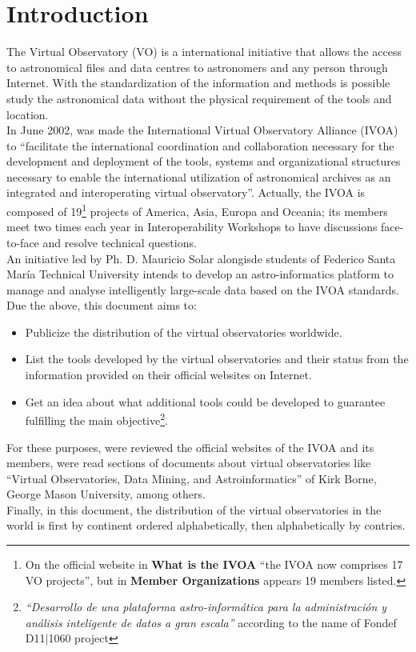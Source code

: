 \section{Introduction}
The Virtual Observatory (VO) \cite{website:ivoa-home} \nocite{Borne2013}
\nocite{HanischQuinn2003} is a international initiative that allows the access
to astronomical files and data centres to astronomers and any person through
Internet. With the standardization of the information and methods is possible
study the astronomical data without the physical requirement of the tools and
location.\\

In June 2002, was made the International Virtual Observatory Alliance (IVOA) to
``facilitate the international coordination and collaboration necessary for the
development and deployment of the tools, systems and organizational structures
necessary to enable the international utilization of astronomical archives as an
integrated and interoperating virtual observatory''.  Actually, the IVOA is
composed of 19\footnote{On the official website in \textbf{What is the IVOA}
``the IVOA now comprises 17 VO projects'', but in \textbf{Member Organizations}
appears 19 members listed.} projects of America, Asia, Europa and Oceania; its
members meet two times each year in Interoperability  Workshops to have
discussions face-to-face and resolve technical questions.\\

An initiative led by Ph. D. Mauricio Solar alongisde students of Federico Santa
Mar\'{i}a Technical University intends to develop an astro-informatics platform
to manage and analyse intelligently large-scale data based on the IVOA
standards. Due the above, this document aims to:

\begin{itemize}
	\item Publicize the distribution of the virtual observatories worldwide.
    \item List the tools developed by the virtual observatories and their status
from the information provided on their official websites on Internet.
    \item Get an idea about what additional tools could be developed to
guarantee fulfilling the main objective\footnote{\textit{``Desarrollo de una
plataforma astro-inform\'{a}tica para la administraci\'{o}n y an\'{a}lisis
inteligente de datos a gran escala''} according to the name of Fondef D11$
\vert $1060 project}.
\end{itemize}

For these purposes, were reviewed the official websites of the IVOA and its
members, were read sections of documents about virtual observatories like
``Virtual Observatories, Data Mining, and Astroinformatics'' of Kirk Borne,
George Mason University, among others.\\

Finally, in this document, the distribution of the virtual observatories in the
world is first by continent ordered alphabetically, then alphabetically by
contries.\\
